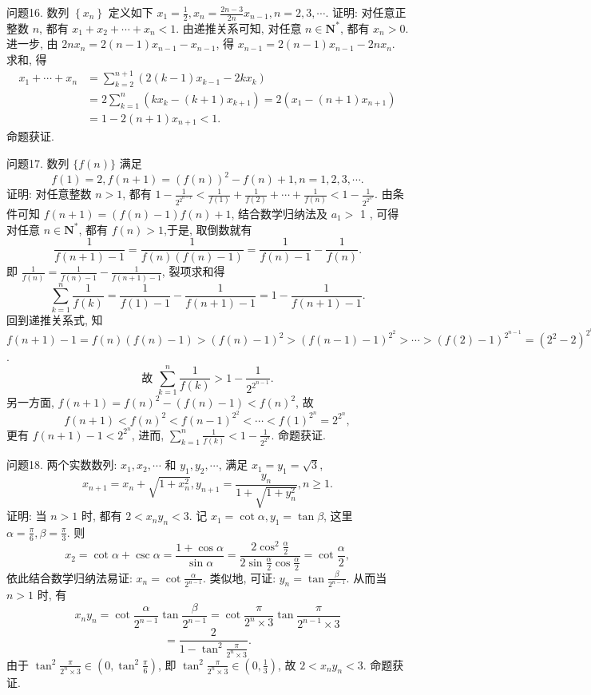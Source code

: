 问题16. 数列 $\left\{x_n\right\}$ 定义如下 $x_1=\frac{1}{2}, x_n=\frac{2 n-3}{2 n} x_{n-1}, n=2,3, \cdots$. 证明: 对任意正整数 $n$, 都有 $x_1+x_2+\cdots+x_n<1$.
由递推关系可知, 对任意 $n \in \mathbf{N}^*$, 都有 $x_n>0$. 进一步, 由 $2 n x_n= 2(n-1) x_{n-1}-x_{n-1}$, 得 $x_{n-1}=2(n-1) x_{n-1}-2 n x_n$. 求和, 得
$$
\begin{aligned}
x_1+\cdots+x_n & =\sum_{k=2}^{n+1}\left(2(k-1) x_{k-1}-2 k x_k\right) \\
& =2 \sum_{k=1}^n\left(k x_k-(k+1) x_{k+1}\right)=2\left(x_1-(n+1) x_{n+1}\right) \\
& =1-2(n+1) x_{n+1}<1 .
\end{aligned}
$$
命题获证.



问题17. 数列 $\{f(n)\}$ 满足
$$
f(1)=2, f(n+1)=(f(n))^2-f(n)+1, n=1,2,3, \cdots .
$$
证明: 对任意整数 $n>1$, 都有 $1-\frac{1}{2^{2^{n-1}}}<\frac{1}{f(1)}+\frac{1}{f(2)}+\cdots+\frac{1}{f(n)}<1-\frac{1}{2^{2^{n^2}}}$.
由条件可知 $f(n+1)=(f(n)-1) f(n)+1$, 结合数学归纳法及 $a_1>$ 1 , 可得对任意 $n \in \mathbf{N}^*$, 都有 $f(n)>1$,于是, 取倒数就有
$$
\frac{1}{f(n+1)-1}=\frac{1}{f(n)(f(n)-1)}=\frac{1}{f(n)-1}-\frac{1}{f(n)} .
$$
即 $\frac{1}{f(n)}=\frac{1}{f(n)-1}-\frac{1}{f(n+1)-1}$, 裂项求和得
$$
\sum_{k=1}^n \frac{1}{f(k)}=\frac{1}{f(1)-1}-\frac{1}{f(n+1)-1}=1-\frac{1}{f(n+1)-1} .
$$
回到递推关系式, 知 $f(n+1)-1=f(n)(f(n)-1)>(f(n)-1)^2> (f(n-1)-1)^{2^2}>\cdots>(f(2)-1)^{2^{n-1}}=\left(2^2-2\right)^{2^{n-1}}=2^{2^{n-1}}$.
$$
\text { 故 } \sum_{k=1}^n \frac{1}{f(k)}>1-\frac{1}{2^{2^{n-1}}} \text {. }
$$
另一方面, $f(n+1)=f(n)^2-(f(n)-1)<f(n)^2$, 故
$$
f(n+1)<f(n)^2<f(n-1)^{2^2}<\cdots<f(1)^{2^n}=2^{2^n},
$$
更有 $f(n+1)-1<2^{2^n}$, 进而, $\sum_{k=1}^n \frac{1}{f(k)}<1-\frac{1}{2^{2^n}}$. 命题获证.



问题18. 两个实数数列: $x_1, x_2, \cdots$ 和 $y_1, y_2, \cdots$, 满足 $x_1=y_1=\sqrt{3}$,
$$
x_{n+1}=x_n+\sqrt{1+x_n^2}, y_{n+1}=\frac{y_n}{1+\sqrt{1+y_n^2}}, n \geqslant 1 .
$$
证明: 当 $n>1$ 时, 都有 $2<x_n y_n<3$.
记 $x_1=\cot \alpha, y_1=\tan \beta$, 这里 $\alpha=\frac{\pi}{6}, \beta=\frac{\pi}{3}$. 则
$$
x_2=\cot \alpha+\csc \alpha=\frac{1+\cos \alpha}{\sin \alpha}=\frac{2 \cos ^2 \frac{\alpha}{2}}{2 \sin \frac{\alpha}{2} \cos \frac{\alpha}{2}}=\cot \frac{\alpha}{2},
$$
依此结合数学归纳法易证: $x_n=\cot \frac{\alpha}{2^{n-1}}$. 类似地, 可证: $y_n=\tan \frac{\beta}{2^{n-1}}$. 从而当 $n>1$ 时, 有
$$
x_n y_n=\cot \frac{\alpha}{2^{n-1}} \tan \frac{\beta}{2^{n-1}}=\cot \frac{\pi}{2^n \times 3} \tan \frac{\pi}{2^{n-1} \times 3}
$$
$$
=\frac{2}{1-\tan ^2 \frac{\pi}{2^n \times 3}} .
$$
由于 $\tan ^2 \frac{\pi}{2^n \times 3} \in\left(0, \tan ^2 \frac{\pi}{6}\right)$, 即 $\tan ^2 \frac{\pi}{2^n \times 3} \in\left(0, \frac{1}{3}\right)$, 故 $2<x_n y_n<3$. 命题获证.



